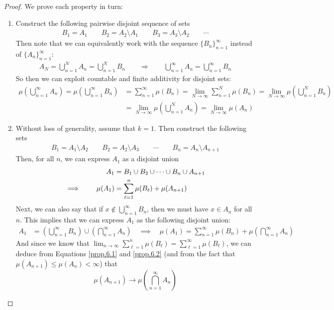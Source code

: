 \documentclass[12pt]{article}
\theoremstyle{plain}
\theoremstyle{definition}
\theoremstyle{remark}
\newcommand{\ninf}{_{n=1}^\infty}
\begin{document}
\begin{proof}
We prove each property in turn:
\begin{enumerate}
  \item
    Construct the following pairwise disjoint sequence of sets
    \begin{align*}
        B_1 = A_1 \qquad B_2 = A_2 \setminus A_1
        \qquad B_3 = A_3 \setminus A_2 \qquad \cdots
    \end{align*}
    Then note that we can equivalently work with the sequence
    $\{B_n\}\ninf$ instead of $\{A_n\}\ninf$:
    \begin{align*}
        A_N = \bigcup^N_{n=1} A_n =
        \bigcup^N_{n=1} B_n
        \qquad \Rightarrow \qquad
        \bigcup^\infty_{n=1} A_n =
        \bigcup^\infty_{n=1} B_n
    \end{align*}
    So then we can exploit countable and finite additivity for disjoint
    sets:
    \begin{align*}
        \mu\left(\bigcup^\infty_{n=1} A_n \right)
        = \mu\left(\bigcup^\infty_{n=1} B_n \right)
        &= \sum^\infty_{n=1} \mu(B_n)
            = \lim_{N\rightarrow\infty}\sum^N_{n=1} \mu(B_n)
        = \lim_{N\rightarrow\infty}
            \mu\left(\bigcup^N_{n=1} B_n\right) \\
        &= \lim_{N\rightarrow\infty}
            \mu\left(\bigcup^N_{n=1} A_n\right)
        = \lim_{N\rightarrow\infty}
            \mu\left(A_n\right)
    \end{align*}
  \item
    Without loss of generality, assume that $k=1$. Then construct the
    following sets
    \begin{align*}
      B_1 = A_1 \setminus A_2 \qquad
      B_2 = A_2 \setminus A_3 \qquad
      \cdots\qquad
      B_n = A_n \setminus A_{n+1}
    \end{align*}
    Then, for all $n$, we can express $A_1$ as a disjoint union
    \begin{align}
        A_1 &= B_1 \cup B_2 \cup \cdots \cup B_n
        \cup A_{n+1} \notag\\
        \implies \qquad
        \mu(A_1) &= \sum^n_{\ell=1} \mu(B_\ell) +
        \mu(A_{n+1}) \label{prop.6.1}
    \end{align}
    Next, we can also say that if $x\not\in \bigcup^\infty_{n=1} B_n$,
    then we must have $x\in A_n$ for all $n$. This implies that we can
    express $A_1$ as the following disjoint union:
    \begin{align}
        A_1 &= \left(\bigcup^\infty_{n=1} B_n \right)\cup
            \left(\bigcap^\infty_{n=1} A_n\right)
        \quad\implies\quad
        \mu(A_1) =
        \sum^\infty_{n=1} \mu(B_n) +
        \mu\left(\bigcap^\infty_{n=1} A_n\right)
        \label{prop.6.2}
    \end{align}
    And since we know that $\lim_{n\rightarrow \infty} \sum^n_{\ell=1}
    \mu(B_\ell) = \sum^\infty_{\ell=1} \mu(B_\ell)$, we can deduce from
    Equations \ref{prop.6.1} and \ref{prop.6.2} (and from the fact that
    $\mu(A_{n+1}) \leq \mu(A_n) <\infty$) that
    \[ \mu(A_{n+1})\rightarrow
        \mu\left(\bigcap^\infty_{n=1} A_n\right)
    \]
\end{enumerate}
\end{proof}
\end{document}

